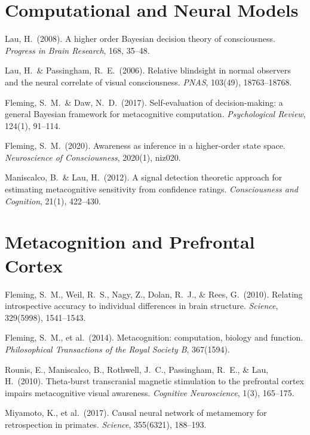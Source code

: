 \documentclass[11pt,a4paper]{report}
\begin{document}
\section*{Computational and Neural Models}
\begin{enumerate}[label={[\arabic*]}, leftmargin=2.5em, start=6]
  \item Lau, H.\ (2008). A higher order Bayesian decision theory of consciousness. \textit{Progress in Brain Research}, 168, 35--48.
  \item Lau, H.\ \& Passingham, R.\ E.\ (2006). Relative blindsight in normal observers and the neural correlate of visual consciousness. \textit{PNAS}, 103(49), 18763--18768.
  \item Fleming, S.\ M.\ \& Daw, N.\ D.\ (2017). Self-evaluation of decision-making: a general Bayesian framework for metacognitive computation. \textit{Psychological Review}, 124(1), 91--114.
  \item Fleming, S.\ M.\ (2020). Awareness as inference in a higher-order state space. \textit{Neuroscience of Consciousness}, 2020(1), niz020.
  \item Maniscalco, B.\ \& Lau, H.\ (2012). A signal detection theoretic approach for estimating metacognitive sensitivity from confidence ratings. \textit{Consciousness and Cognition}, 21(1), 422--430.
\end{enumerate}

\section*{Metacognition and Prefrontal Cortex}
\begin{enumerate}[label={[\arabic*]}, leftmargin=2.5em, start=11]
  \item Fleming, S.\ M., Weil, R.\ S., Nagy, Z., Dolan, R.\ J., \& Rees, G.\ (2010). Relating introspective accuracy to individual differences in brain structure. \textit{Science}, 329(5998), 1541--1543.
  \item Fleming, S.\ M., et al.\ (2014). Metacognition: computation, biology and function. \textit{Philosophical Transactions of the Royal Society B}, 367(1594).
  \item Rounis, E., Maniscalco, B., Rothwell, J.\ C., Passingham, R.\ E., \& Lau, H.\ (2010). Theta-burst transcranial magnetic stimulation to the prefrontal cortex impairs metacognitive visual awareness. \textit{Cognitive Neuroscience}, 1(3), 165--175.
  \item Miyamoto, K., et al.\ (2017). Causal neural network of metamemory for retrospection in primates. \textit{Science}, 355(6321), 188--193.
\end{enumerate}
\end{document}

